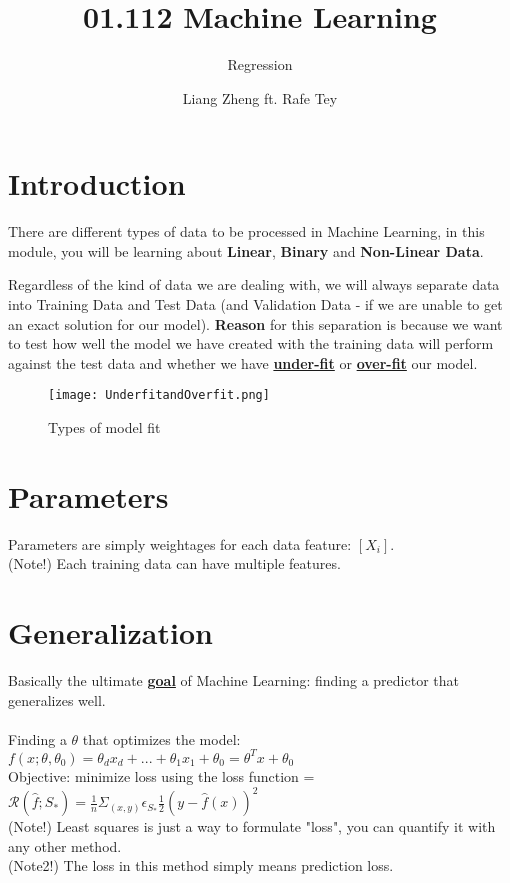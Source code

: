 \documentclass[a4paper]{article}
\title{01.112 Machine Learning}
\author{Regression}
\date{Liang Zheng ft. Rafe Tey}
\begin{document}
\maketitle

\section{Introduction}

There are different types of data to be processed in Machine Learning, in this module, you will be learning about \textbf{Linear}, \textbf{Binary} and \textbf{Non-Linear Data}.


Regardless of the kind of data we are dealing with, we will always separate data into Training Data and Test Data (and Validation Data - if we are unable to get an exact solution for our model). \textbf{Reason} for this separation is because we want to test how well the model we have created with the training data will perform against the test data and whether we have \textbf{\underline{under-fit}} or \textbf{\underline{over-fit}} our model. 

\begin{figure}[h]
    \centering
\texttt{[image: UnderfitandOverfit.png]}
    \caption{Types of model fit}
    \label{fig:my_label}
\end{figure}

\section{Parameters}
Parameters are simply weightages for each data feature:  $[X_i]$. \\
(Note!) Each training data can have multiple features.

\section{Generalization}

Basically the ultimate \textbf{\underline{goal}} of Machine Learning: finding a predictor that generalizes well. \\ \\
Finding a $\theta$ that optimizes the model:
$f(x; \theta,\theta_0) = \theta_d x_d + ... + \theta_1 x_1 + \theta_0 = \theta^T x + \theta_0$ \\
Objective: minimize loss using the loss function =
$\mathcal{R}(\hat{f}; S_*) = \frac{1}{n}\Sigma _(x,y)\epsilon _{S_*} \frac{1}{2}(y - \hat{f}(x))^2$ \\
(Note!) Least squares is just a way to formulate "loss", you can quantify it with any other method. \\
(Note2!) The loss in this method simply means prediction loss.
\pagebreak
 
\end{document}
